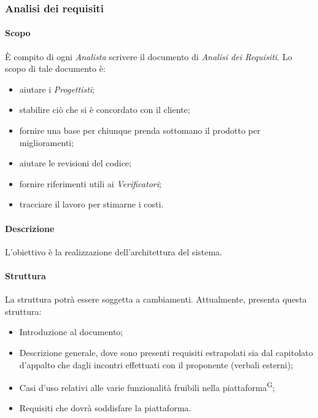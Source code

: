 \subsubsection{Analisi dei requisiti}
\paragraph{Scopo}
È compito di ogni \textit{Analista} scrivere il documento di \textit{Analisi dei Requisiti}. Lo scopo di tale documento è:
\begin{itemize}
  \item aiutare i \textit{Progettisti};
  \item stabilire ciò che si è concordato con il cliente;
  \item fornire una base per chiunque prenda sottomano il prodotto per miglioramenti;
  \item aiutare le revisioni del codice;
  \item fornire riferimenti utili ai \textit{Verificatori};
  \item tracciare il lavoro per stimarne i costi.
\end{itemize}

\paragraph{Descrizione}
L’obiettivo è la realizzazione dell’architettura del sistema.

\paragraph{Struttura}
La struttura potrà essere soggetta a cambiamenti. Attualmente, \AdR  presenta questa struttura:
\begin{itemize}
  \item Introduzione al documento;
  \item Descrizione generale, dove sono presenti requisiti estrapolati sia dal capitolato d’appalto che dagli incontri effettuati con il proponente (verbali esterni);
  \item Casi d'uso relativi alle varie funzionalità fruibili nella piattaforma\textsuperscript{G};
  \item Requisiti che dovrà soddisfare la piattaforma.
\end{itemize}

